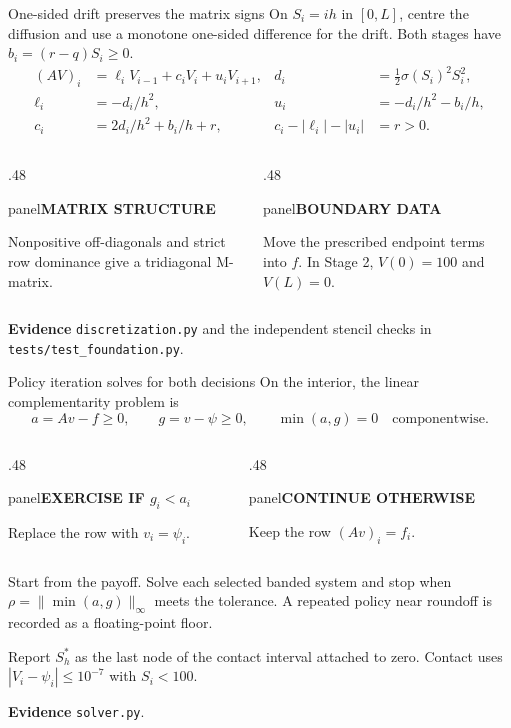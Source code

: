 \documentclass[aspectratio=169,11pt]{beamer}
\newcommand{\panel}[1]{%
  \begin{beamercolorbox}[wd=\linewidth,sep=2.2mm]{panel}#1\end{beamercolorbox}}
\newcommand{\labeltext}[1]{{\footnotesize\bfseries\color{Teal}#1}}
\newcommand{\sourcefile}[1]{\par\vfill{\scriptsize\color{Muted}#1\par}}
\newcommand{\norm}[1]{\lVert #1\rVert_{\infty}}
\begin{document}
\begin{frame}[t]{One-sided drift preserves the matrix signs}
  On $S_i=ih$ in $[0,L]$, centre the diffusion and use a monotone
  one-sided difference for the drift. Both stages have $b_i=(r-q)S_i\ge0$.
  \[
    \begin{aligned}
      (AV)_i &= \ell_i V_{i-1}+c_i V_i+u_iV_{i+1},
         &d_i&=\tfrac12\sigma(S_i)^2 S_i^2,\\
      \ell_i&=-d_i/h^2,
         &u_i&=-d_i/h^2-b_i/h,\\
      c_i&=2d_i/h^2+b_i/h+r,
         &c_i-|\ell_i|-|u_i|&=r>0.
    \end{aligned}
  \]
  \begin{columns}[T,onlytextwidth]
    \begin{column}{.48\textwidth}
      \panel{\labeltext{MATRIX STRUCTURE}\par\smallskip
      Nonpositive off-diagonals and strict row dominance give a
      tridiagonal M-matrix.}
    \end{column}
    \begin{column}{.48\textwidth}
      \panel{\labeltext{BOUNDARY DATA}\par\smallskip
      Move the prescribed endpoint terms into $f$.
      In Stage 2, $V(0)=100$ and $V(L)=0$.}
    \end{column}
  \end{columns}
  \sourcefile{\textbf{Evidence} \enspace \texttt{discretization.py} and the independent stencil checks in \texttt{tests/test\_foundation.py}.}
\end{frame}

\begin{frame}[t]{Policy iteration solves for both decisions}
  On the interior, the linear complementarity problem is
  \[
     a=Av-f\ge0,\qquad g=v-\psi\ge0,\qquad \min(a,g)=0
     \quad\text{componentwise}.
  \]
  \begin{columns}[T,onlytextwidth]
    \begin{column}{.48\textwidth}
      \panel{\labeltext{EXERCISE IF $g_i<a_i$}\par\smallskip
        Replace the row with $v_i=\psi_i$.}
    \end{column}
    \begin{column}{.48\textwidth}
      \panel{\labeltext{CONTINUE OTHERWISE}\par\smallskip
        Keep the row $(Av)_i=f_i$.}
    \end{column}
  \end{columns}
  \medskip
  Start from the payoff. Solve each selected banded system and
  stop when $\rho=\norm{\min(a,g)}$ meets the tolerance.
  A repeated policy near roundoff is recorded as a floating-point floor.
  \par\medskip
  \small
  Report $S_h^*$ as the last node of the contact interval attached to zero.
  Contact uses $|V_i-\psi_i|\le10^{-7}$ with $S_i<100$.
  \sourcefile{\textbf{Evidence} \enspace \texttt{solver.py}.}
\end{frame}
\end{document}
